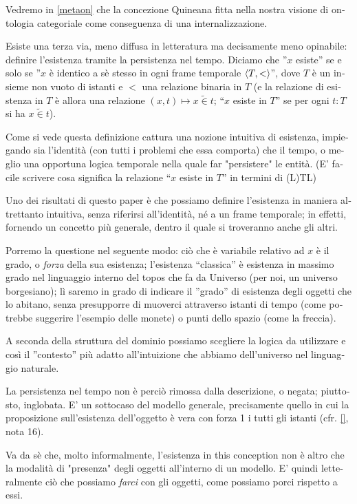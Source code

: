 \begin{italian}
 	Vedremo in \autoref{metaon} che la concezione Quineana fitta nella nostra visione di ontologia categoriale come conseguenza di una internalizzazione.

 	Esiste una terza via, meno diffusa in letteratura ma decisamente meno opinabile: definire l'esistenza tramite la persistenza nel tempo. Diciamo che ''$x$ esiste'' se e solo se ''$x$ è identico a sè stesso in ogni frame temporale $\langle T,<\rangle$'', dove $T$ è un insieme non vuoto di istanti e $<$ una relazione binaria in $T$ (e la relazione di esistenza in $T$ è allora una relazione $(x,t)\mapsto x\mathrel{\tilde\in} t$; ``$x$ esiste in $T$'' se per ogni $t : T$ si ha $x\mathrel{\tilde\in} t$).

 	Come si vede questa definizione cattura una nozione intuitiva di esistenza, impiegando sia l'identità (con tutti i problemi che essa comporta) che il tempo, o meglio una opportuna logica temporale nella quale far "persistere" le entità. (E' facile scrivere cosa significa la relazione ``$x$ esiste in $T$'' in termini di (L)TL)

	 Uno dei risultati di questo paper è che possiamo definire l'esistenza in maniera altrettanto intuitiva, senza riferirsi all'identità, né a un frame temporale; in effetti, fornendo un concetto più generale, dentro il quale si troveranno anche gli altri.

	 Porremo la questione nel seguente modo: ciò che è variabile relativo ad $x$ è il grado, o \emph{forza} della sua esistenza; l'esistenza ``classica'' è esistenza in massimo grado nel linguaggio interno del topos che fa da Universo (per noi, un universo borgesiano); lì saremo in grado di indicare il ''grado'' di esistenza degli oggetti che lo abitano, senza presupporre di muoverci attraverso istanti di tempo (come potrebbe suggerire l'esempio delle monete) o punti dello spazio (come la freccia).

	 A seconda della struttura del dominio possiamo scegliere la logica da utilizzare e così il ''contesto'' più adatto all'intuizione che abbiamo dell'universo nel linguaggio naturale.

 	La persistenza nel tempo non è perciò rimossa dalla descrizione, o negata; piuttosto, inglobata. E' un sottocaso del modello generale, precisamente quello in cui la proposizione sull'esistenza dell'oggetto è vera con forza 1 i tutti gli istanti (cfr. \autoref{}, nota 16).

 	Va da sè che, molto informalmente, l'esistenza in this conception non è altro che la modalità di "presenza" degli oggetti all'interno di un modello. E' quindi letteralmente ciò che possiamo \emph{farci} con gli oggetti, come possiamo porci rispetto a essi.


\end{italian}
